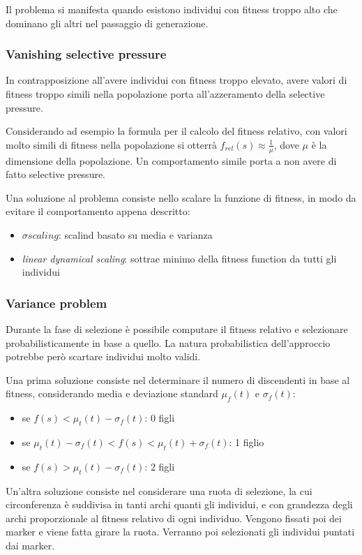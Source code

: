 \documentclass[a4paper]{article}
\begin{document}
Il problema si manifesta quando esistono individui con fitness troppo alto che dominano gli altri
nel passaggio di generazione.

\subsubsection{Vanishing selective pressure}
In contrapposizione all'avere individui con fitness troppo elevato, 
avere valori di fitness troppo simili nella popolazione porta all'azzeramento della selective pressure.

Considerando ad esempio la formula per il calcolo del fitness relativo, 
con valori molto simili di fitness nella popolazione si otterrà $f_{rel}(s) \approx \frac{1}{\mu}$, 
dove $\mu$ è la dimensione della popolazione.
Un comportamento simile porta a non avere di fatto selective pressure.

Una soluzione al problema consiste nello scalare la funzione di fitness, in 
modo da evitare il comportamento appena descritto:
\begin{itemize}
    \item $\sigma scaling$: scalind basato su media e varianza
    \item \emph{linear dynamical scaling}: sottrae minimo della fitness function da tutti gli individui 
\end{itemize}

\subsubsection{Variance problem}
Durante la fase di selezione è possibile computare il fitness relativo e selezionare 
probabilisticamente in base a quello.
La natura probabilistica dell'approccio potrebbe però scartare individui molto validi.

Una prima soluzione consiste nel determinare il numero di discendenti in base 
al fitness, considerando media e deviazione standard $\mu_f(t)$ e $\sigma_f(t)$:
\begin{itemize}
    \item se $f(s) < \mu_t(t) - \sigma_f(t)$: 0 figli
    \item se $\mu_t(t) - \sigma_f(t) < f(s) < \mu_t(t) + \sigma_f(t)$: 1 figlio
    \item se $f(s) > \mu_t(t) - \sigma_f(t)$: 2 figli
\end{itemize} 

Un'altra soluzione consiste nel considerare una ruota di selezione, 
la cui circonferenza è suddivisa in tanti archi quanti gli individui, e con grandezza
degli archi proporzionale al fitness relativo di ogni individuo.
Vengono fissati poi dei marker e viene fatta girare la ruota.
Verranno poi selezionati gli individui puntati dai marker.
\end{document}
